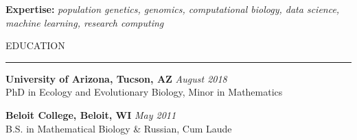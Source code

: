 \documentclass{resume} %
\renewenvironment{rSection}[1]{
\sectionskip
\textcolor{RoyalPurple}{\MakeUppercase{#1}}
\sectionlineskip
\hrule
\begin{list}{}{
\setlength{\leftmargin}{1.5em}
}
\item[]
}{
\end{list}
}
\begin{document}
\textcolor{RoyalPurple}{\bf Expertise:}
\textcolor{RoyalPurple}{\small \em population genetics, genomics, computational biology, data science, machine learning, research computing}


\begin{rSection}{Education}

{\bf University of Arizona, Tucson, AZ} \hfill {\em August 2018} \\ 
PhD in Ecology and Evolutionary Biology, Minor in Mathematics 

{\bf Beloit College, Beloit, WI} \hfill {\em May 2011} \\ 
B.S. in Mathematical Biology \& Russian, Cum Laude

\end{rSection}

\end{document}
